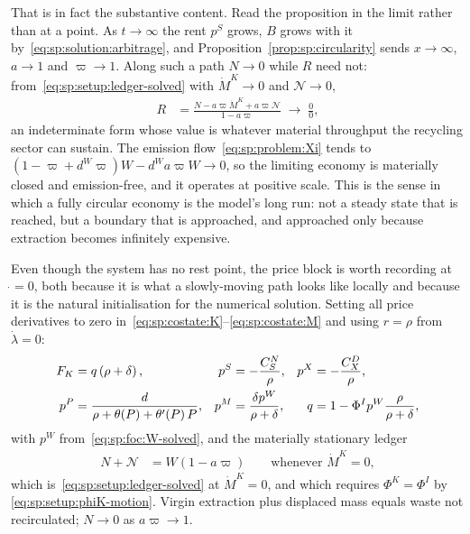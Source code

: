 That is in fact the substantive content. Read the proposition in the limit rather than at a point.
As $t\to\infty$ the rent $p^S$ grows, $B$ grows with it by~\eqref{eq:sp:solution:arbitrage}, and
Proposition~\ref{prop:sp:circularity} sends $x\to\infty$, $a\to1$ and $\varpi\to1$. Along such a
path $N\to0$ while $R$ need not: from~\eqref{eq:sp:setup:ledger-solved} with $\dot M^K\to0$ and
$\mathcal N\to0$,
\begin{align}
R &= \frac{N-a\varpi\dot M^K+a\varpi\mathcal N}{1-a\varpi}\;\longrightarrow\;\frac{0}{0},
\label{eq:sp:solution:limit}
\end{align}
an indeterminate form whose value is whatever material throughput the recycling sector can sustain.
The emission flow~\eqref{eq:sp:problem:Xi} tends to $\left(1-\varpi+d^W\varpi\right)W-d^Wa\varpi W\to0$,
so the limiting economy is materially closed and emission-free, and it operates at positive scale.
This is the sense in which a fully circular economy is the model's long run: not a steady state that
is reached, but a boundary that is approached, and approached only because extraction becomes
infinitely expensive.

 Even though the system has no rest point, the price block is
worth recording at $\dot{}=0$, both because it is what a slowly-moving path looks like locally and
because it is the natural initialisation for the numerical solution. Setting all price derivatives
to zero in~\eqref{eq:sp:costate:K}--\eqref{eq:sp:costate:M} and using $r=\rho$ from
$\dot\lambda=0$:
\begin{align}
F_K &= q\left(\rho+\delta\right),
&
p^S &= -\frac{C^N_S}{\rho},
&
p^X &= -\frac{C^D_X}{\rho},
\notag\\
p^P &= \frac{d}{\rho+\theta\!\left(P\right)+\theta'\!\left(P\right)P},
&
p^M &= \frac{\delta p^W}{\rho+\delta},
&
q &= 1-\Phi^Ip^W\frac{\rho}{\rho+\delta},
\label{eq:sp:solution:quasistationary}
\end{align}
with $p^W$ from~\eqref{eq:sp:foc:W-solved}, and the materially stationary ledger
\begin{align}
N+\mathcal N &= W\left(1-a\varpi\right)
\qquad\text{whenever }\dot M^K=0,
\label{eq:sp:solution:material-stationary}
\end{align}
which is~\eqref{eq:sp:setup:ledger-solved} at $\dot M^K=0$, and which requires $\Phi^K=\Phi^I$ by
\eqref{eq:sp:setup:phiK-motion}. Virgin extraction plus displaced mass equals waste not recirculated;
$N\to0$ as $a\varpi\to1$.

